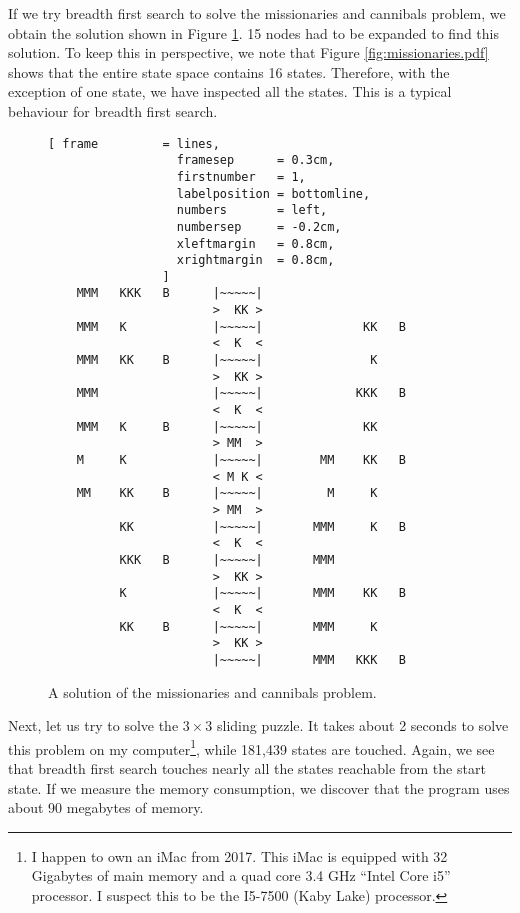 If we try breadth first search to solve the missionaries and cannibals problem, we obtain
the solution shown in Figure \ref{fig:missionaries.solution}.  15 nodes had to be expanded to find
this solution.  To keep this in perspective, we note that Figure \ref{fig:missionaries.pdf} shows
that the entire state space contains 16 states.  Therefore, with the exception of one state, we have
inspected all the states.  This is a typical behaviour for breadth first search.

\begin{figure}[!ht]
\centering
\begin{Verbatim}[ frame         = lines,
                  framesep      = 0.3cm,
                  firstnumber   = 1,
                  labelposition = bottomline,
                  numbers       = left,
                  numbersep     = -0.2cm,
                  xleftmargin   = 0.8cm,
                  xrightmargin  = 0.8cm,
                ]
    MMM   KKK   B      |~~~~~|
                       >  KK >
    MMM   K            |~~~~~|              KK   B
                       <  K  <
    MMM   KK    B      |~~~~~|               K
                       >  KK >
    MMM                |~~~~~|             KKK   B
                       <  K  <
    MMM   K     B      |~~~~~|              KK
                       > MM  >
    M     K            |~~~~~|        MM    KK   B
                       < M K <
    MM    KK    B      |~~~~~|         M     K
                       > MM  >
          KK           |~~~~~|       MMM     K   B
                       <  K  <
          KKK   B      |~~~~~|       MMM
                       >  KK >
          K            |~~~~~|       MMM    KK   B
                       <  K  <
          KK    B      |~~~~~|       MMM     K
                       >  KK >
                       |~~~~~|       MMM   KKK   B
\end{Verbatim}
\vspace*{-0.3cm}
\caption{A solution of the missionaries and cannibals problem.}
\label{fig:missionaries.solution}
\end{figure}

Next, let us try to solve the $3 \times 3$ sliding puzzle.  It takes about 2 seconds to solve
this problem on my computer\footnote{
  I happen to own an iMac from 2017.  This iMac is equipped with 32 Gigabytes of main memory and a
  quad core 3.4 GHz ``Intel Core i5'' processor.  I suspect this to be the I5-7500 (Kaby Lake) processor.
}, while 181,439 states are touched.  
Again, we see that breadth first search touches nearly all the states reachable from the start state.
If we measure the memory consumption, we discover that the program uses about 90 megabytes of memory.

